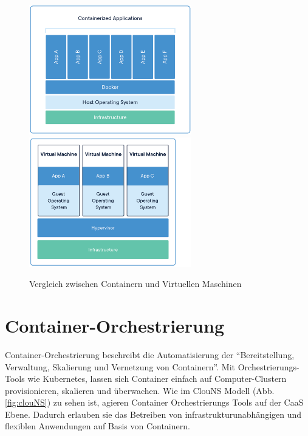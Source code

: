 \begin{figure}[H]
    \includegraphics[width=200pt]{img/container-architecture.png}
    \includegraphics[width=200pt]{img/vm-architecture.png}
    
    \caption[Vergleich zwischen Containern und Virtuellen Maschinen]{Vergleich zwischen Containern und Virtuellen Maschinen\cite{noauthor_what_nodate}}
    \label{fig:containerVsVMs}
\end{figure}

\section{Container-Orchestrierung}
Container-Orchestrierung beschreibt die Automatisierung der "`Bereitstellung, Verwaltung, Skalierung und Vernetzung von Containern"'\cite{noauthor_was_nodate-1}. Mit Orchestrierungs-Tools wie Kubernetes, lassen sich Container einfach auf Computer-Clustern provisionieren, skalieren und überwachen. Wie im ClouNS Modell (Abb. \ref{fig:clouNS}) zu sehen ist, agieren Container Orchestrierungs Tools auf der CaaS Ebene. Dadurch erlauben sie das Betreiben von infrastrukturunabhängigen und flexiblen Anwendungen auf Basis von Containern\cite{noauthor_was_nodate}.
